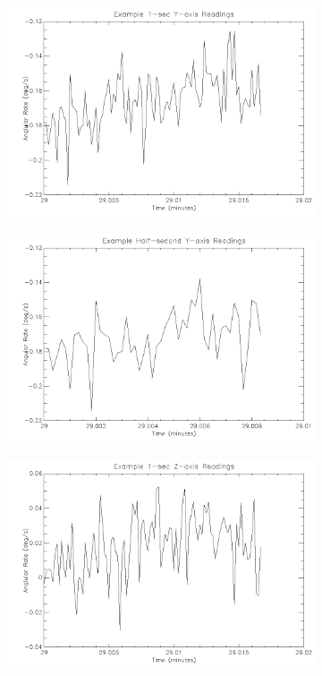 \begin{figure}[htbp]
\begin{subfigure}{0.45\textwidth}
		\includegraphics[width=1\linewidth]{appendix/img/campaign_results/gyroy1sec.png}
		\caption{}
		\label{fig:sub:gyroy1}
	\end{subfigure}
	\begin{subfigure}{0.45\textwidth}
		\includegraphics[width=1\linewidth]{appendix/img/campaign_results/gyroyhalfsec.png}
		\caption{}
		\label{fig:sub:gyroyh}
	\end{subfigure}
	\begin{subfigure}{0.45\textwidth}
		\includegraphics[width=1\linewidth]{appendix/img/campaign_results/gyroz1sec.png}

\end{subfigure}
\end{figure}
